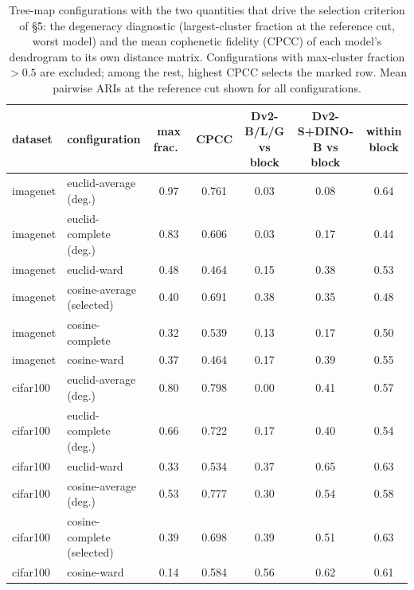 \begin{table}[H]
\centering
\scriptsize
\setlength{\tabcolsep}{3pt}
\begin{tabular}{llccccc}
\toprule
dataset & configuration & max frac.\ & CPCC & Dv2-B/L/G vs block & Dv2-S+DINO-B vs block & within block \\
\midrule
imagenet & euclid-average (deg.) & 0.97 & 0.761 & 0.03 & 0.08 & 0.64 \\
imagenet & euclid-complete (deg.) & 0.83 & 0.606 & 0.03 & 0.17 & 0.44 \\
imagenet & euclid-ward & 0.48 & 0.464 & 0.15 & 0.38 & 0.53 \\
imagenet & cosine-average (selected) & 0.40 & 0.691 & 0.38 & 0.35 & 0.48 \\
imagenet & cosine-complete & 0.32 & 0.539 & 0.13 & 0.17 & 0.50 \\
imagenet & cosine-ward & 0.37 & 0.464 & 0.17 & 0.39 & 0.55 \\
\midrule
cifar100 & euclid-average (deg.) & 0.80 & 0.798 & 0.00 & 0.41 & 0.57 \\
cifar100 & euclid-complete (deg.) & 0.66 & 0.722 & 0.17 & 0.40 & 0.54 \\
cifar100 & euclid-ward & 0.33 & 0.534 & 0.37 & 0.65 & 0.63 \\
cifar100 & cosine-average (deg.) & 0.53 & 0.777 & 0.30 & 0.54 & 0.58 \\
cifar100 & cosine-complete (selected) & 0.39 & 0.698 & 0.39 & 0.51 & 0.63 \\
cifar100 & cosine-ward & 0.14 & 0.584 & 0.56 & 0.62 & 0.61 \\
\bottomrule
\end{tabular}
\caption{Tree-map configurations with the two quantities that drive the selection criterion of \S5: the degeneracy diagnostic (largest-cluster fraction at the reference cut, worst model) and the mean cophenetic fidelity (CPCC) of each model's dendrogram to its own distance matrix. Configurations with max-cluster fraction $>0.5$ are excluded; among the rest, highest CPCC selects the marked row. Mean pairwise ARIs at the reference cut shown for all configurations.}
\label{tab:b7-treemapcontrols}
\end{table}
